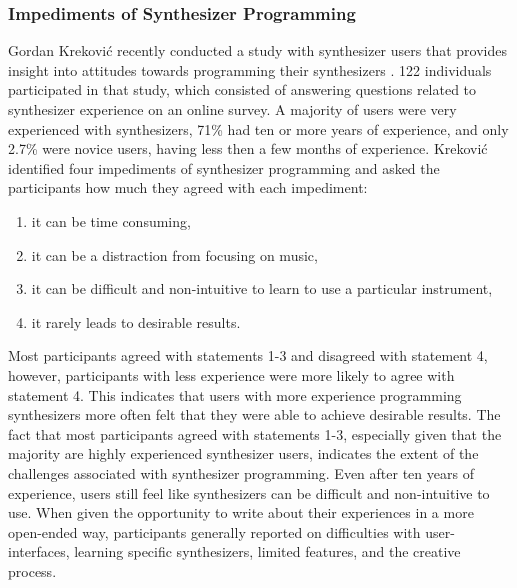 \subsubsection{Impediments of Synthesizer Programming}
Gordan Krekovi\'{c} recently conducted a study with synthesizer users that provides insight into attitudes towards programming their synthesizers \cite{krekovic2019insights}. 122 individuals participated in that study, which consisted of answering questions related to synthesizer experience on an online survey. A majority of users were very experienced with synthesizers, 71\% had ten or more years of experience, and only 2.7\% were novice users, having less then a few months of experience. Krekovi\'{c} identified four impediments of synthesizer programming and asked the participants how much they agreed with each impediment:
\begin{enumerate}
    \item it can be time consuming,
    \item it can be a distraction from focusing on music,
    \item it can be difficult and non-intuitive to learn to use a particular instrument,
    \item it rarely leads to desirable results.
\end{enumerate}
Most participants agreed with statements 1-3 and disagreed with statement 4, however, participants with less experience were more likely to agree with statement 4. This indicates that users with more experience programming synthesizers more often felt that they were able to achieve desirable results. The fact that most participants agreed with statements 1-3, especially given that the majority are highly experienced synthesizer users, indicates the extent of the challenges associated with synthesizer programming. Even after ten years of experience, users still feel like synthesizers can be difficult and non-intuitive to use. When given the opportunity to write about their experiences in a more open-ended way, participants generally reported on difficulties with user-interfaces, learning specific synthesizers, limited features, and the creative process.

